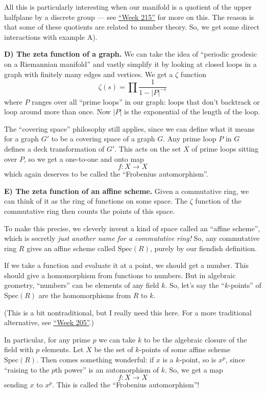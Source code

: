 \documentclass{article}
\begin{document}
All this is particularly interesting when our manifold is a quotient of
the upper halfplane by a discrete group --- see
\protect\hyperlink{week215}{``Week 215''} for more on this. The reason
is that some of these quotients are related to number theory. So, we get
some direct interactions with example A).

\textbf{D) The zeta function of a graph.} We can take the idea of
``periodic geodesic on a Riemannian manifold'' and vastly simplify it by
looking at closed loops in a graph with finitely many edges and
vertices. We get a \(\zeta\) function
\[\zeta(s) = \prod \frac{1}{1 - |P|^{-s}}\] where \(P\) ranges over all
``prime loops'' in our graph: loops that don't backtrack or loop around
more than once. Now \(|P|\) is the exponential of the length of the
loop.

The ``covering space'' philosophy still applies, since we can define
what it means for a graph \(G'\) to be a covering space of a graph
\(G\). Any prime loop \(P\) in \(G\) defines a deck transformation of
\(G'\). This acts on the set \(X\) of prime loops sitting over \(P\), so
we get a one-to-one and onto map \[f\colon X \to X\] which again
deserves to be called the ``Frobenius automorphism''.

\textbf{E) The zeta function of an affine scheme.} Given a commutative
ring, we can think of it as the ring of functions on some space. The
\(\zeta\) function of the commutative ring then counts the points of
this space.

To make this precise, we cleverly invent a kind of space called an
``affine scheme'', which is secretly \emph{just another name for a
commutative ring!} So, any commutative ring \(R\) gives an affine scheme
called \(\mathrm{Spec}(R)\), purely by our fiendish definition.

If we take a function and evaluate it at a point, we should get a
number. This should give a homomorphism from functions to numbers. But
in algebraic geometry, ``numbers'' can be elements of any field \(k\).
So, let's say the ``\(k\)-points'' of \(\mathrm{Spec}(R)\) are the
homomorphisms from \(R\) to \(k\).

(This is a bit nontraditional, but I really need this here. For a more
traditional alternative, see \protect\hyperlink{week205}{``Week 205''}.)

In particular, for any prime \(p\) we can take \(k\) to be the algebraic
closure of the field with \(p\) elements. Let \(X\) be the set of
\(k\)-points of some affine scheme \(\mathrm{Spec}(R)\). Then comes
something wonderful: if \(x\) is a \(k\)-point, so is \(x^p\), since
``raising to the \(p\)th power'' is an automorphism of \(k\). So, we get
a map \[f\colon X \to X\] sending \(x\) to \(x^p\). This is called the
``Frobenius automorphism''!
\end{document}
